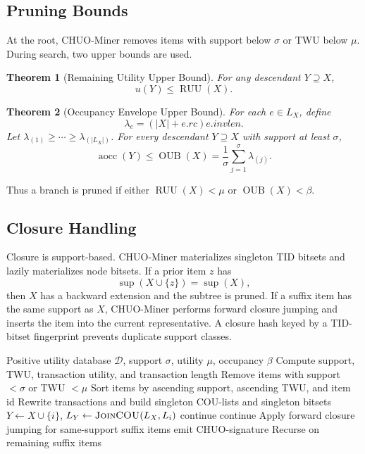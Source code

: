 \documentclass[11pt,a4paper]{article}
\newtheorem{theorem}{Theorem}
\newcommand{\D}{\mathcal{D}}
\newcommand{\supp}{\operatorname{sup}}
\newcommand{\aocc}{\operatorname{aocc}}
\newcommand{\RUU}{\operatorname{RUU}}
\newcommand{\OUB}{\operatorname{OUB}}
\begin{document}
\subsection{Pruning Bounds}

At the root, CHUO-Miner removes items with support below \(\sigma\) or TWU below \(\mu\). During search, two upper bounds are used.

\begin{theorem}[Remaining Utility Upper Bound]
For any descendant \(Y\supseteq X\),
\[
u(Y)\le \RUU(X).
\]
\end{theorem}

\begin{theorem}[Occupancy Envelope Upper Bound]
For each \(e\in L_X\), define
\[
\lambda_e=(|X|+e.rc)e.invlen.
\]
Let \(\lambda_{(1)}\ge\cdots\ge\lambda_{(|L_X|)}\). For every descendant \(Y\supseteq X\) with support at least \(\sigma\),
\[
\aocc(Y)\le \OUB(X)=\frac{1}{\sigma}\sum_{j=1}^{\sigma}\lambda_{(j)}.
\]
\end{theorem}

Thus a branch is pruned if either \(\RUU(X)<\mu\) or \(\OUB(X)<\beta\).

\subsection{Closure Handling}

Closure is support-based. CHUO-Miner materializes singleton TID bitsets and lazily materializes node bitsets. If a prior item \(z\) has
\[
\supp(X\cup\{z\})=\supp(X),
\]
then \(X\) has a backward extension and the subtree is pruned. If a suffix item has the same support as \(X\), CHUO-Miner performs forward closure jumping and inserts the item into the current representative. A closure hash keyed by a TID-bitset fingerprint prevents duplicate support classes.

\begin{algorithm}[H]
\caption{CHUO-Miner}
\label{alg:chuo}
\begin{algorithmic}[1]
\REQUIRE Positive utility database \(\D\), support \(\sigma\), utility \(\mu\), occupancy \(\beta\)
\STATE Compute support, TWU, transaction utility, and transaction length
\STATE Remove items with support \(<\sigma\) or TWU \(<\mu\)
\STATE Sort items by ascending support, ascending TWU, and item id
\STATE Rewrite transactions and build singleton COU-lists and singleton bitsets
    \STATE \(Y\leftarrow X\cup\{i\}\), \(L_Y\leftarrow\textsc{JoinCOU}(L_X,L_i)\)
    \IF{\(|L_Y|<\sigma\) or \(\RUU(Y)<\mu\) or \(\OUB(Y)<\beta\)} \STATE continue \ENDIF
     \STATE continue \ENDIF
    \STATE Apply forward closure jumping for same-support suffix items
    \IF{\(u(Y)\ge\mu\) and \(\aocc(Y)\ge\beta\)} \STATE emit CHUO-signature \ENDIF
    \STATE Recurse on remaining suffix items
\ENDFOR
\end{algorithmic}
\end{algorithm}
\end{document}
